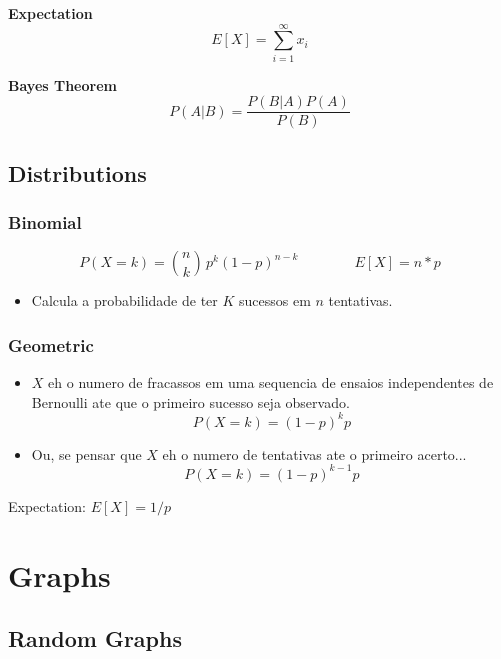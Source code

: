 \documentclass[10pt, twocolumn]{article}
\begin{document}
\begin{flushleft}
\textbf{Expectation}
$$E[X] = \sum_{i=1}^{\infty} x_i$$

\textbf{Bayes Theorem}
$$P(A|B) = \frac{P(B|A) P(A)}{P(B)}$$

\subsection{Distributions}
\subsubsection{Binomial}

$$P(X = k) = \binom{n}{k}\,p^{k}(1-p)^{n-k} \qquad \qquad E[X] = n*p$$

\begin{itemize}
\item Calcula a probabilidade de ter $K$ sucessos em $n$ tentativas.
\end{itemize}



\subsubsection{Geometric}
\begin{itemize}
\item $X$ eh o numero de fracassos em uma sequencia de ensaios independentes de Bernoulli ate que o primeiro sucesso seja observado.$$P(X = k) = (1-p)^{k}p$$
\item Ou, se pensar que $X$ eh o numero de tentativas ate o primeiro acerto...
$$P(X = k) = (1-p)^{k-1}p$$
\end{itemize}


Expectation: $E[X] = 1/p$




\section{Graphs}

\subsection{Random Graphs}

% 
% 
%


\end{flushleft}
\end{document}
